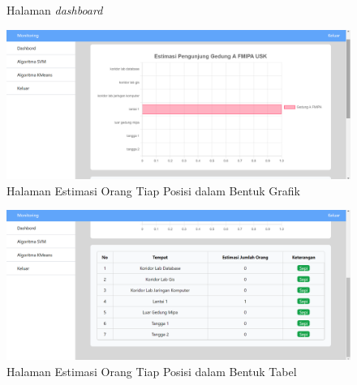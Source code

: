 \begin{enumerate}[a.]
\begin{figure}[H]
		      \caption{Halaman \textit{dashboard}}
		      \label{Dashboard}
	      \end{figure}
	      \begin{figure}[H]
		      \center
		      \includegraphics [width = 13.5 cm, height= 6.75 cm]{gambar/web/Estimasi_Grafik}
		      \caption{Halaman Estimasi Orang Tiap Posisi dalam Bentuk Grafik}
		      \label{Estimasi_Grafik}
	      \end{figure}
	      \begin{figure}[H]
		      \center
		      \includegraphics [width = 13.5 cm, height= 6.75 cm]{gambar/web/Estimasi_Tabel}
		      \caption{Halaman Estimasi Orang Tiap Posisi dalam Bentuk Tabel}
		      \label{Estimasi_Tabel}
	      \end{figure}
\end{enumerate}



